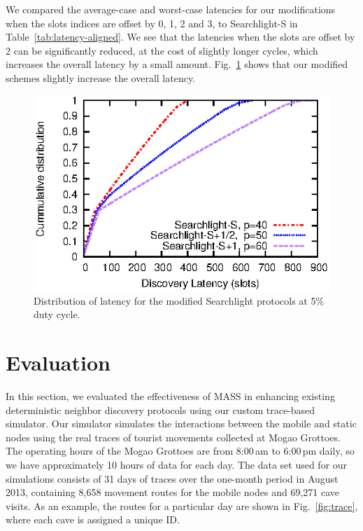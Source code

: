 \documentclass[twoside,twocolumn]{article}
\begin{document}
We compared the average-case and worst-case latencies for our
modifications when the slots indices are offset by 0, 1, 2 and 3, to
Searchlight-S in Table~\ref{tab:latency-aligned}.  We see that the
latencies when the slots are offset by 2 can be significantly reduced,
at the cost of slightly longer cycles, which increases the overall
latency by a small amount. Fig.~\ref{fig:searchlight-cdf} shows that
our modified schemes slightly increase the overall latency.

\begin{figure}[t]
   \centering
   \includegraphics{graphs/analysis/searchlight-cdf}
   \caption{Distribution of latency for the modified Searchlight
          protocols at 5\% duty cycle.}
   \label{fig:searchlight-cdf}
\end{figure}


\section{Evaluation}
\label{sec:eval}

In this section, we evaluated the effectiveness of MASS in enhancing
existing deterministic neighbor discovery protocols using our custom
trace-based simulator.  Our simulator simulates the interactions
between the mobile and static nodes using the real traces of tourist
movements collected at Mogao Grottoes.  The operating hours of the
Mogao Grottoes are from 8:00\,am to 6:00\,pm daily, so we have
approximately 10 hours of data for each day.  The data set used for
our simulations consists of 31 days of traces over the one-month
period in August 2013, containing 8,658 movement routes for the mobile
nodes and 69,271 cave visits.  As an example, the routes for a
particular day are shown in Fig.~\ref{fig:trace}, where each cave is
assigned a unique ID.
\end{document}
